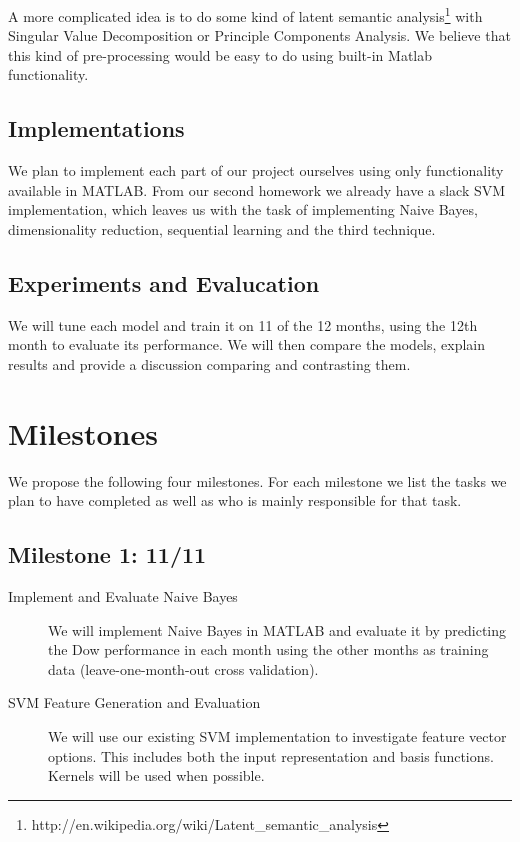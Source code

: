 \documentclass[10pt]{article}
\begin{document}
A more complicated idea is to do some kind of latent semantic analysis\footnote{http://en.wikipedia.org/wiki/Latent\_semantic\_analysis} with Singular Value Decomposition or Principle Components Analysis. We believe that this kind of pre-processing would be easy to do using built-in Matlab functionality.

\subsection{Implementations}
We plan to implement each part of our project ourselves using only functionality available in MATLAB.
From our second homework we already have a slack SVM implementation, which leaves us with the task of implementing Naive Bayes, dimensionality reduction, sequential learning and the third technique.

\subsection{Experiments and Evalucation}
We will tune each model and train it on 11 of the 12 months, using the 12th month to evaluate its performance.
We will then compare the models, explain results and provide a discussion comparing and contrasting them.

\section{Milestones}
We propose the following four milestones. For each milestone we list the tasks we plan to have completed as well as who is mainly responsible for that task.

\subsection{Milestone 1: 11/11}

\begin{description}
\item[Implement and Evaluate Naive Bayes] We will implement Naive Bayes in MATLAB and evaluate it by predicting the Dow performance in each month using the other months as training data (leave-one-month-out cross validation).
\item[SVM Feature Generation and Evaluation] We will use our existing SVM implementation to investigate feature vector options. This includes both the input representation and basis functions. Kernels will be used when possible.

\end{description}
\end{document}
